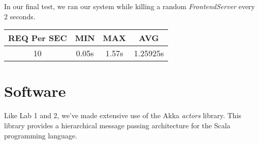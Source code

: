 \documentclass[11pt]{article}
\begin{document}
In our final test, we ran our system while killing a random
\emph{FrontendServer} every 2 seconds.

\begin{tabular}{c|c|c|c}
  REQ Per SEC & MIN & MAX & AVG \\
  \hline
  10  & 0.05s  & 1.57s & 1.25925s \\
\end{tabular}



\section{Software}
Like Lab 1 and 2, we've made extensive use of the Akka \emph{actors}
library.  This library provides a hierarchical message passing
architecture for the Scala programming language.
\end{document}

